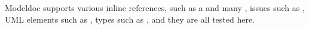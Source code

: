 Modeldoc supports various inline references, such as a  and many ,
issues such as ,
UML elements such as ,
types such as ,
and they are all tested here.
